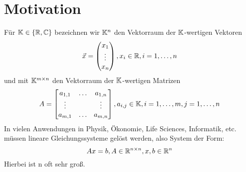 \section*{Motivation}
Für $\mathbb{K} \in \{\mathbb{R}, \mathbb{C} \}$ bezeichnen wir $\mathbb{K}^{n}$ den Vektorraum der  $\mathbb{K}$-wertigen Vektoren 
\[
\vec{x}=\begin{pmatrix} x_1 \\ \vdots \\ x_n \end{pmatrix}, x_{i}\in \mathbb{R}, i=1,\ldots,n
\]
und mit $\mathbb{K}^{m\times n}$ den Vektorraum der $\mathbb{K}$-wertigen Matrizen 
\[
A= \begin{bmatrix}
	a_{1,1} & \ldots & a_{1,n} \\

	\vdots & & \vdots \\
	a_{m,1} & \ldots & a_{m,n}
\end{bmatrix}, a_{i,j} \in \mathbb{K}, i=1,\ldots,m , j=1,\ldots,n
\]
In vielen Anwendungen in Physik, Ökonomie, Life Sciences, Informatik, etc.
müssen lineare Gleichungssysteme gelöst werden, also System der Form:
\[
Ax=b, A \in \mathbb{R}^{n\times n}, x,b \in \mathbb{R}^{n}
\]
Hierbei ist n oft sehr groß.
